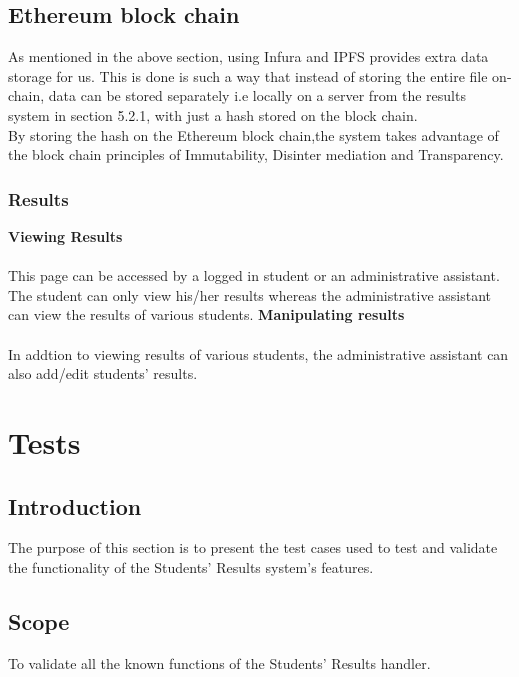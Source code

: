 \subsection{Ethereum block chain}
As mentioned in the above section, using Infura and IPFS provides extra data storage for us. This is done is such a way that instead of storing the entire file on-chain, data can be stored separately i.e locally on a server from the results system in section 5.2.1, with just a hash stored on the block chain.\\By storing the hash on the Ethereum block chain,the system takes advantage of the block chain principles of Immutability, Disinter mediation and Transparency.

\subsubsection{Results}
\textbf{Viewing Results}\\~\\
This page can be accessed by a logged in student or an administrative assistant. The student can only view his/her results whereas the administrative assistant can view the results of various students.
\textbf{Manipulating results}\\~\\
In addtion to viewing results of various students, the administrative assistant can also add/edit students’ results.

\section{Tests}
\subsection{Introduction}
The purpose of this section is to present the test cases used to test and validate the functionality of the Students' Results system's features.
\subsection{Scope}
To validate all the known functions of the Students' Results handler.
